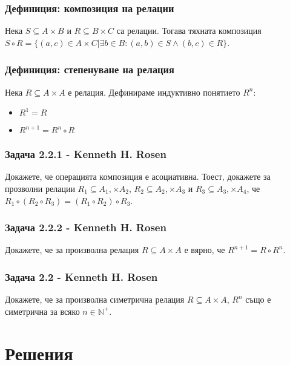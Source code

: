 \documentclass[12pt]{article}
\begin{document}
\subsubsection*{Дефиниция: композиция на релации}
Нека $S \subseteq A \times B$ и $R \subseteq B \times C$ са релации. Тогава тяхната композиция $S \circ R = \{ (a, c) \in A \times C | \exists b \in B: (a, b) \in S \land (b, c) \in R \}$.

\subsubsection*{Дефиниция: степенуване на релация}
Нека $R \subseteq A \times A$ е релация. Дефинираме индуктивно понятието $R^n$:
\begin{itemize}
    \item $R^1 = R$
    \item $R^{n+1} = R^n \circ R$
\end{itemize}

\subsubsection*{Задача 2.2.1 - Kenneth H. Rosen}
Докажете, че операцията композиция е асоциативна. Тоест, докажете за прозволни релации $R_1 \subseteq A_1, \times A_2$, $R_2 \subseteq A_2, \times A_3$ и $R_3 \subseteq A_3, \times A_4$, че $R_1 \circ (R_2 \circ R_3) = (R_1 \circ R_2) \circ R_3$.

\subsubsection*{Задача 2.2.2 - Kenneth H. Rosen}
Докажете, че за произволна релация $R \subseteq A \times A$ е вярно, че $R^{n+1} = R \circ R^{n}$.

\subsubsection*{Задача 2.2 - Kenneth H. Rosen}
Докажете, че за произволна симетрична релация $R \subseteq A \times A$, $R^n$ също е симетрична за всяко $n \in \mathbb{N}^+$.

\section*{Решения}
\end{document}

